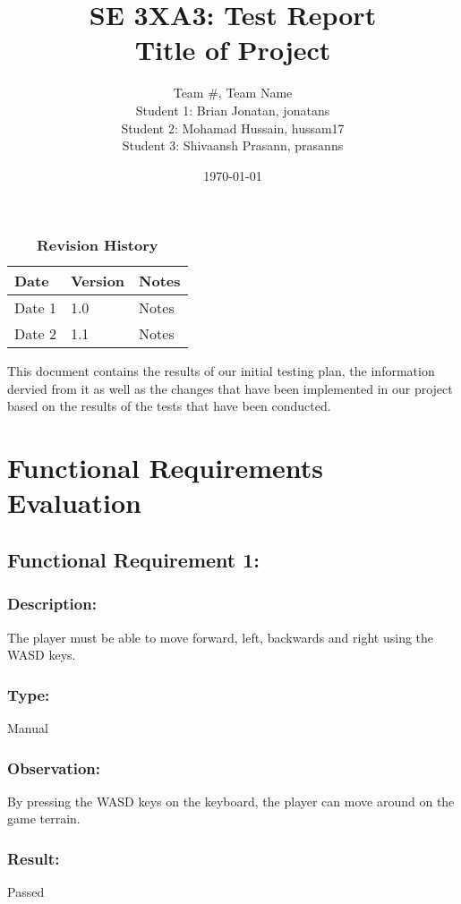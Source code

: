 \documentclass[12pt, titlepage]{article}
\title{SE 3XA3: Test Report\\Title of Project}
\author{Team \#, Team Name
		\\ Student 1: Brian Jonatan,  jonatans
		\\ Student 2: Mohamad Hussain, hussam17
		\\ Student 3: Shivaansh Prasann, prasanns
}
\date{\today}
\begin{document}
\maketitle

\tableofcontents
\listoftables
\listoffigures

\begin{table}[bp]
\caption{\bf Revision History}
\begin{tabularx}{\textwidth}{p{3cm}p{2cm}X}
\toprule {\bf Date} & {\bf Version} & {\bf Notes}\\
\midrule
Date 1 & 1.0 & Notes\\
Date 2 & 1.1 & Notes\\
\bottomrule
\end{tabularx}
\end{table}

\newpage


This document contains the results of our initial testing plan, the information dervied from it as well as the changes that have been implemented in our project based on the results of the tests that have been conducted.

\section{Functional Requirements Evaluation}
\subsection{Functional Requirement 1: } 

\subsubsection{Description: }The player must be able to move forward, left, backwards and right using the WASD keys.

\subsubsection{Type: } Manual

\subsubsection{Observation: } By pressing the WASD keys on the keyboard, the player can move around on the game terrain. 

\subsubsection[Pass / Fail:] {Result: } Passed
\end{document}
